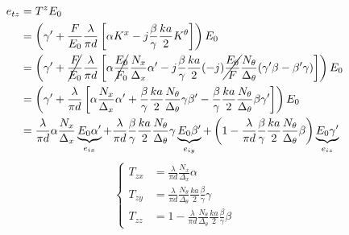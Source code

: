 \begin{align*}
    e_{tz} &= T^z E_0
    \\
    &=
    \left(
        \gamma' +
        \frac{F}{E_0}
        \frac{\lambda}{\pi d}
        \left[
            \alpha K^x - j \frac{\beta}{\gamma} \frac{ka}{2} K^\theta
        \right]
    \right)
    E_0
    \\
    &=
    \left(
        \gamma' +
        \cancel{\frac{F}{E_0}}
        \frac{\lambda}{\pi d}
        \left[
            \alpha
            \cancel{\frac{E_0}{F_0}}
            \frac{N_x}{\Delta_x}
            \alpha'
            -
            j
            \frac{\beta}{\gamma}
            \frac{ka}{2}
            (-j)
            \cancel{\frac{E_0}{F}}
            \frac{N_\theta}{\Delta_\theta}
            (\gamma' \beta - \beta' \gamma)
        \right]
    \right)
    E_0
    \\
    &=
    \left(
        \gamma' +
        \frac{\lambda}{\pi d}
        \left[
            \alpha
            \frac{N_x}{\Delta_x}
            \alpha'
            +
            \frac{\beta}{\gamma}
            \frac{ka}{2}
            \frac{N_\theta}{\Delta_\theta}
            \gamma
            \beta'
            -
            \frac{\beta}{\gamma}
            \frac{ka}{2}
            \frac{N_\theta}{\Delta_\theta}
            \beta
            \gamma'
        \right]
    \right)
    E_0
    \\
    &=
    \frac{\lambda}{\pi d}
    \alpha
    \frac{N_x}{\Delta_x}
    \underbrace{E_0 \alpha'}_{e_{ix}}
    +
    \frac{\lambda}{\pi d}
    \frac{\beta}{\gamma}
    \frac{ka}{2}
    \frac{N_\theta}{\Delta_\theta}
    \gamma
    \underbrace{E_0 \beta'}_{e_{iy}}
    +
    \left(
        1
        -
        \frac{\lambda}{\pi d}
        \frac{\beta}{\gamma}
        \frac{ka}{2}
        \frac{N_\theta}{\Delta_\theta}
        \beta
    \right)
    \underbrace{E_0 \gamma'}_{e_{iz}}
\end{align*}
\begin{equation}
    \left\lbrace
    \begin{aligned}
        T_{zx}
        &= \frac{\lambda}{\pi d}
           \frac{N_x}{\Delta_x}
           \alpha
        \\
        T_{zy}
        &= \frac{\lambda}{\pi d}
           \frac{N_\theta}{\Delta_\theta}
           \frac{ka}{2}
           \frac{\beta}{\gamma}
           \gamma
        \\
        T_{zz}
        &= 1
           -
           \frac{\lambda}{\pi d}
           \frac{N_\theta}{\Delta_\theta}
           \frac{ka}{2}
           \frac{\beta}{\gamma}
           \beta
    \end{aligned}
    \right.
\end{equation}

